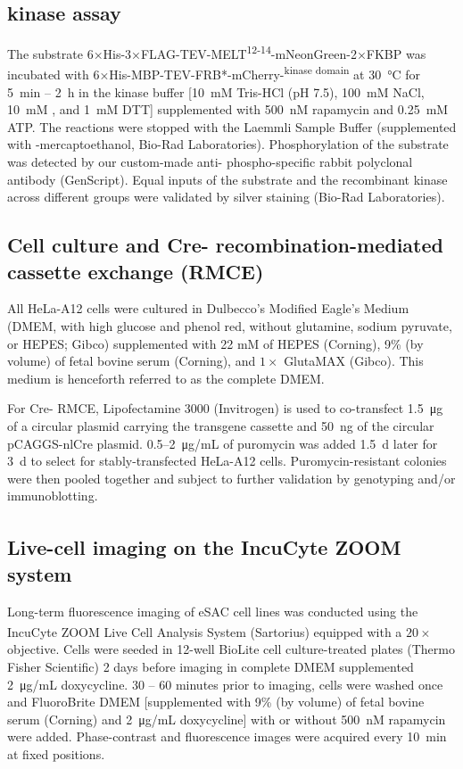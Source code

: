 \subsection{ kinase assay}
The substrate 6×His-3×FLAG-TEV-MELT\textsuperscript{12-14}-mNeonGreen-2×FKBP was incubated with 6×His-MBP-TEV-FRB*-mCherry-\textsuperscript{kinase domain} at \SI{30}{\celsius} for \SI{5}{min} -- \SI{2}{h} in the kinase buffer [\SI{10}{mM} Tris-HCl (pH 7.5), \SI{100}{mM} NaCl, \SI{10}{mM} , and \SI{1}{mM} DTT] supplemented with \SI{500}{nM} rapamycin and \SI{0.25}{mM} ATP. The reactions were stopped with the Laemmli Sample Buffer (supplemented with \textbeta-mercaptoethanol, Bio-Rad Laboratories). Phosphorylation of the substrate was detected by our custom-made anti- phospho-specific rabbit polyclonal antibody (GenScript). Equal inputs of the substrate and the recombinant kinase across different groups were validated by silver staining (Bio-Rad Laboratories).

\subsection{Cell culture and Cre- recombination-mediated cassette exchange (RMCE)}
\label{CellCulture+RMCE_Methods}
All HeLa-A12 cells were cultured in Dulbecco's Modified Eagle's Medium (DMEM, with high glucose and phenol red, without glutamine, sodium pyruvate, or HEPES; Gibco) supplemented with 22 mM of HEPES (Corning), 9\% (by volume) of fetal bovine serum (Corning), and $1\times$ GlutaMAX (Gibco). This medium is henceforth referred to as the complete DMEM.

For Cre- RMCE, Lipofectamine 3000 (Invitrogen) is used to co-transfect \SI{1.5}{\micro g} of a circular plasmid carrying the transgene cassette and \SI{50}{ng} of the circular pCAGGS-nlCre plasmid. 0.5--\SI{2}{\micro g/mL} of puromycin was added \SI{1.5}{d} later for \SI{3}{d} to select for stably-transfected HeLa-A12 cells. Puromycin-resistant colonies were then pooled together and subject to further validation by genotyping and/or immunoblotting.

\subsection{Live-cell imaging on the IncuCyte\textsuperscript{\textregistered} ZOOM system}
Long-term fluorescence imaging of eSAC cell lines was conducted using the IncuCyte\textsuperscript{\textregistered} ZOOM Live Cell Analysis System (Sartorius) equipped with a $20\times$ objective. Cells were seeded in 12-well BioLite cell culture-treated plates (Thermo Fisher Scientific) 2 days before imaging in complete DMEM supplemented \SI{2}{\micro g/mL} doxycycline. 30 -- 60 minutes prior to imaging, cells were washed once and FluoroBrite\texttrademark{} DMEM [supplemented with 9\% (by volume) of fetal bovine serum (Corning) and \SI{2}{\micro g/mL} doxycycline] with or without \SI{500}{nM} rapamycin were added. Phase-contrast and fluorescence images were acquired every \SI{10}{min} at fixed positions.